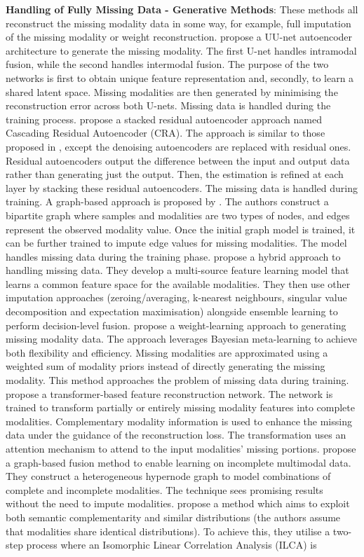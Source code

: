 \textbf{Handling of Fully Missing Data - Generative Methods}:
These methods all reconstruct the missing modality data in some way, for example, full imputation of the missing modality or weight reconstruction. \citet{9755996} propose a UU-net autoencoder architecture to generate the missing modality. The first U-net handles intramodal fusion, while the second handles intermodal fusion. The purpose of the two networks is first to obtain unique feature representation and, secondly, to learn a shared latent space. Missing modalities are then generated by minimising the reconstruction error across both U-nets. Missing data is handled during the training process. \citet{Tran_2017_CVPR} propose a stacked residual autoencoder approach named Cascading Residual Autoencoder (CRA).
The approach is similar to those proposed in \cite{8273601,9099281}, except the denoising autoencoders are replaced with residual ones. Residual autoencoders output the difference between the input and output data rather than generating just the output. Then, the estimation is refined at each layer by stacking these residual autoencoders. The missing data is handled during training. A graph-based approach is proposed by \citet{10.1007/978-3-031-30675-4_19}. The authors construct a bipartite graph where samples and modalities are two types of nodes, and edges represent the observed modality value. Once the initial graph model is trained, it can be further trained to impute edge values for missing modalities. The model handles missing data during the training phase. \citet{YUAN2012622} propose a hybrid approach to handling missing data. They develop a multi-source feature learning model that learns a common feature space for the available modalities. They then use other imputation approaches (zeroing/averaging, k-nearest neighbours, singular value decomposition and expectation maximisation) alongside ensemble learning to perform decision-level fusion. \citet{smil} propose a weight-learning approach to generating missing modality data. The approach leverages Bayesian meta-learning to achieve both flexibility and efficiency. Missing modalities are approximated using a weighted sum of modality priors instead of directly generating the missing modality. This method approaches the problem of missing data during training. \citet{10.1145/3474085.3475585} propose a transformer-based feature reconstruction network. The network is trained to transform partially or entirely missing modality features into complete modalities. Complementary modality information is used to enhance the missing data under the guidance of the reconstruction loss. The transformation uses an attention mechanism to attend to the input modalities' missing portions. \citet{10.1145/3394486.3403182} propose a graph-based fusion method to enable learning on incomplete multimodal data. They construct a heterogeneous hypernode graph to model combinations of complete and incomplete modalities. The technique sees promising results without the need to impute modalities. \citet{8253467} propose a method which aims to exploit both semantic complementarity and similar distributions (the authors assume that modalities share identical distributions). To achieve this, they utilise a two-step process where an Isomorphic Linear Correlation Analysis (ILCA) is 